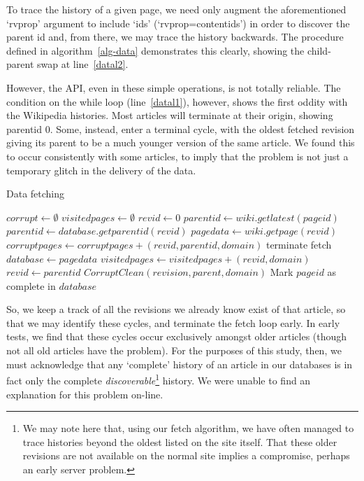 To trace the history of a given page, we need only augment the
aforementioned `rvprop' argument to include `ids'
(`rvprop=content{\textbar}ids') in order to discover the parent id and, from
there, we may trace the history backwards. The procedure defined in
algorithm~\ref{alg-data} demonstrates this clearly, showing the
child-parent swap at line~\ref{datal2}. 

However, the API, even in these simple operations, is not totally
reliable. The condition on the while loop (line~\ref{datal1}),
however, shows the first oddity with the Wikipedia histories. Most
articles will terminate at their origin, showing parentid 0. Some,
instead, enter a terminal cycle, with the oldest fetched revision
giving its parent to be a much younger version of the same article. We
found this to occur consistently with some articles, to imply that the
problem is not just a temporary glitch in the delivery of the data.

\begin{algorithm}
  \caption{Data fetching}\label{alg-data}
  \begin{algorithmic}[5]
    \State $corrupt \gets \emptyset$
    \State $visitedpages \gets \emptyset$
    \State $revid \gets 0$
    \State $parentid \gets wiki.getlatest(pageid)$
    \label{datal1} 
    \State $parentid \gets database.getparentid(revid)$
    \Else
    \State $pagedata \gets wiki.getpage(revid)$
    \EndIf
    \label{datal3}
    \State $corruptpages \gets corruptpages + (revid, parentid, domain)$
    \Else
    \State terminate fetch\label{datal4}
    \EndIf
    \Else
    \State $database \gets page data$
    \EndIf
    \State $visitedpages \gets visitedpages + (revid, domain)$
    \State $revid \gets parentid$\label{datal2}
    \EndWhile
    \State $CorruptClean(revision, parent, domain)$
    \EndFor
    \State Mark $pageid$ as complete in $database$
    \EndProcedure
  \end{algorithmic}
\end{algorithm}

So, we keep a track of all the revisions we already know exist of that
article, so that we may identify these cycles, and terminate the fetch
loop early. In early tests, we find that these cycles occur
exclusively amongst older articles (though not all old articles have
the problem). For the purposes of this study, then, we must
acknowledge that any `complete' history of an article in our databases
is in fact only the complete \textit{discoverable}\footnote{We may
  note here that, using our fetch algorithm, we have often managed to
  trace histories beyond the oldest listed on the site itself. That
  these older revisions are not available on the normal site implies a
  compromise, perhaps an early server problem.}  history. We were
unable to find an explanation for this problem on-line.

